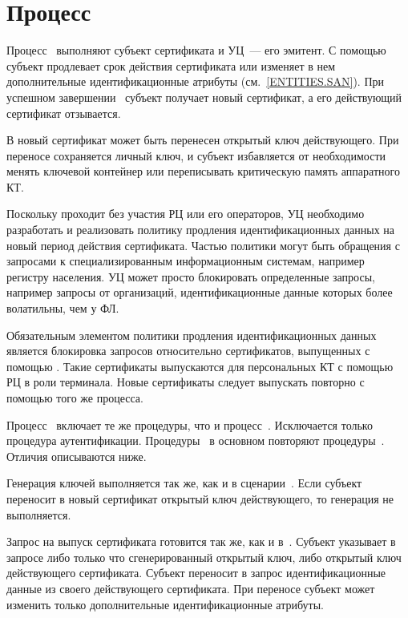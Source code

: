 \section{Процесс }\label{PROCESSES.Reenroll}

Процесс~ выполняют субъект сертификата и УЦ~--- его эмитент. С
помощью  субъект продлевает срок действия сертификата или
изменяет в нем дополнительные идентификационные атрибуты
(см.~\ref{ENTITIES.SAN}).
%
При успешном завершении~ субъект получает новый сертификат, а его
действующий сертификат отзывается.

В новый сертификат может быть перенесен открытый ключ действующего. При переносе
сохраняется личный ключ, и субъект избавляется от необходимости менять ключевой
контейнер или переписывать критическую память аппаратного КТ.

Поскольку  проходит без участия РЦ или его операторов, УЦ
необходимо разработать и реализовать политику продления идентификационных данных
на новый период действия сертификата.
%
Частью политики могут быть обращения с запросами к специализированным
информационным системам, например регистру населения.
%
УЦ может просто блокировать определенные запросы, например запросы от 
организаций, идентификационные данные которых более волатильны, чем у ФЛ.

\begin{note*}
Обязательным элементом политики продления идентификационных данных является
блокировка запросов относительно сертификатов, выпущенных с помощью
. Такие сертификаты выпускаются для персональных КТ с помощью РЦ в
роли терминала. Новые сертификаты следует выпускать повторно с помощью того же
процесса.
\end{note*}

Процесс~ включает те же процедуры, что и процесс~.
Исключается только процедура аутентификации. Процедуры~ в
основном повторяют процедуры~. Отличия описываются ниже.

Генерация ключей выполняется так же, как и в сценарии~. Если
субъект переносит в новый сертификат открытый ключ действующего, то генерация не
выполняется.

Запрос на выпуск сертификата готовится так же, как и в~.
%
Субъект указывает в запросе либо только что сгенерированный открытый ключ, либо
открытый ключ действующего сертификата.
%
Субъект переносит в запрос идентификационные данные из своего действующего
сертификата. При переносе субъект может изменить только дополнительные
идентификационные атрибуты.

